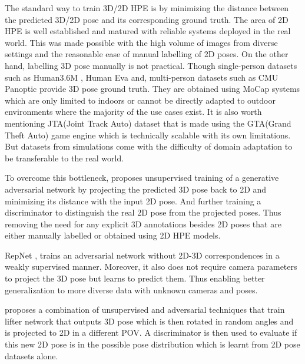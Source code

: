 The standard way to train 3D/2D \ac{HPE} is by minimizing the distance between the predicted 3D/2D pose and its corresponding ground truth. The area of 2D \ac{HPE} is well established and matured with reliable systems deployed in the real world. This was made possible with the high volume of images from diverse settings and the reasonable ease of manual labelling of 2D poses. On the other hand, labelling 3D pose manually is not practical. Though single-person datasets such as Human3.6M \cite{H3.6}, Human Eva \cite{HumanEva} and, multi-person datasets such as CMU Panoptic \cite{cmuPanoptic} provide 3D pose ground truth. They are obtained using \ac{MoCap} systems which are only limited to indoors or cannot be directly adapted to outdoor environments where the majority of the use cases exist. It is also worth mentioning JTA(Joint Track Auto) dataset \cite{JTA} that is made using the GTA(Grand Theft Auto) game engine which is technically scalable with its own limitations. But datasets from simulations come with the difficulty of domain adaptation to be transferable to the real world.  

To overcome this bottleneck, \cite{unsupervisedAdversarial} proposes unsupervised training of a generative adversarial network by projecting the predicted 3D pose back to 2D and minimizing its distance with the input 2D pose. And further training a discriminator to distinguish the real 2D pose from the projected poses. Thus removing the need for any explicit 3D annotations besides 2D poses that are either manually labelled or obtained using 2D \ac{HPE} models. 

RepNet \cite{repnet}, trains an adversarial network without 2D-3D correspondences in a weakly supervised manner. Moreover, it also does not require camera parameters to project the 3D pose but learns to predict them. Thus enabling better generalization to more diverse data with unknown cameras and poses. 

\cite{amazon1} proposes a combination of unsupervised and adversarial techniques that train lifter network that outputs 3D pose which is then rotated in random angles and is projected to 2D in a different \ac{POV}. A discriminator is then used to evaluate if this new 2D pose is in the possible pose distribution which is learnt from 2D pose datasets alone. 


